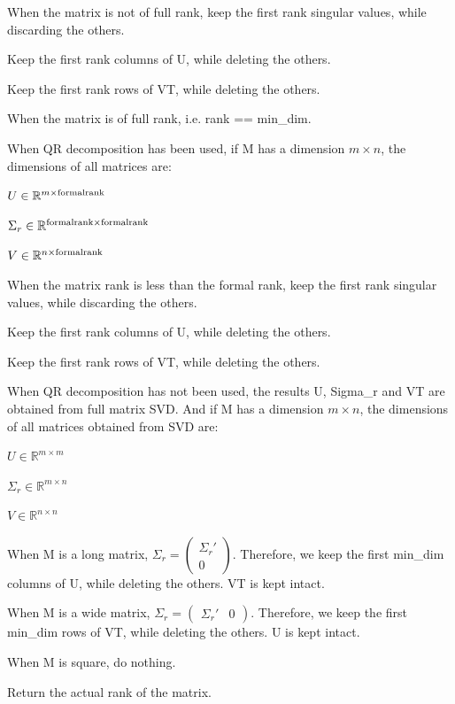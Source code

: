\begin{DoxyDescription}
When the matrix is not of full rank, keep the first {\ttfamily rank} singular values, while discarding the others.

Keep the first {\ttfamily rank} columns of {\ttfamily U}, while deleting the others.

Keep the first {\ttfamily rank} rows of {\ttfamily VT}, while deleting the others.

When the matrix is of full rank, i.\+e. {\ttfamily rank} == {\ttfamily min\+\_\+dim}.

When QR decomposition has been used, if {\ttfamily M} has a dimension $m \times n$, the dimensions of all matrices are\+:
\begin{DoxyItemize}
\item $U \in \mathbb{R}^{m \times {\rm formal rank}}$
\item $\Sigma_r \in \mathbb{R}^{{\rm formal rank} \times {\rm formal rank}}$
\item $V \in \mathbb{R}^{n \times {\rm formal rank}}$
\end{DoxyItemize}

When the matrix rank is less than the formal rank, keep the first {\ttfamily rank} singular values, while discarding the others.

Keep the first {\ttfamily rank} columns of {\ttfamily U}, while deleting the others.

Keep the first {\ttfamily rank} rows of {\ttfamily VT}, while deleting the others.

When QR decomposition has not been used, the results {\ttfamily U}, {\ttfamily Sigma\+\_\+r} and {\ttfamily VT} are obtained from full matrix S\+VD. And if {\ttfamily M} has a dimension $m \times n$, the dimensions of all matrices obtained from S\+VD are\+:
\begin{DoxyItemize}
\item $U \in \mathbb{R}^{m \times m}$
\item $\Sigma_r \in \mathbb{R}^{m \times n}$
\item $V \in \mathbb{R}^{n \times n}$
\end{DoxyItemize}

When {\ttfamily M} is a long matrix, $\Sigma_r = \begin{pmatrix}\Sigma_r' \\ 0 \end{pmatrix}$. Therefore, we keep the first {\ttfamily min\+\_\+dim} columns of {\ttfamily U}, while deleting the others. {\ttfamily VT} is kept intact.

When {\ttfamily M} is a wide matrix, $\Sigma_r = \begin{pmatrix} \Sigma_r' & 0 \end{pmatrix}$. Therefore, we keep the first {\ttfamily min\+\_\+dim} rows of {\ttfamily VT}, while deleting the others. {\ttfamily U} is kept intact.

When {\ttfamily M} is square, do nothing.

Return the actual rank of the matrix.


\end{DoxyDescription}

